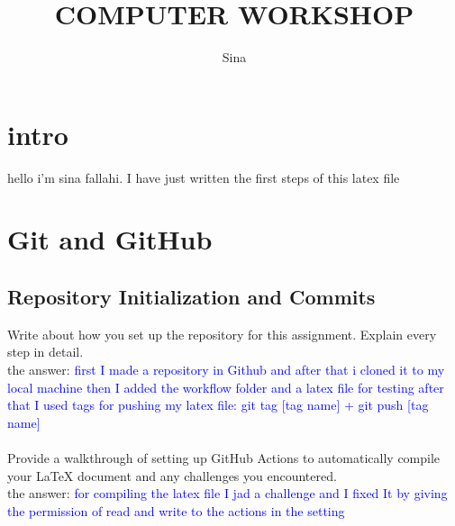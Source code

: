 \documentclass[titlepage]{article}
\title{COMPUTER WORKSHOP}
\author{Sina}
\begin{document}
\maketitle
\section{intro}
hello i'm sina fallahi. I have just written the first steps of this latex file

\section{Git and GitHub}

\subsection{Repository Initialization and Commits}
Write about how you set up the repository for this assignment. Explain every step in
detail.\\
the answer: \textcolor{blue}{first I made a repository in Github and after that i cloned it to my local machine then I added the workflow folder and a latex file for testing after that I used tags for pushing my latex file: git tag [tag name] + git push [tag name]}
\\ \\Provide a walkthrough of setting up GitHub Actions to automatically compile your LaTeX
document and any challenges you encountered.\\
the answer: \textcolor{blue}{for compiling the latex file I jad a challenge and I fixed It by giving the permission of read and write to the actions in the setting}
\end{document}

